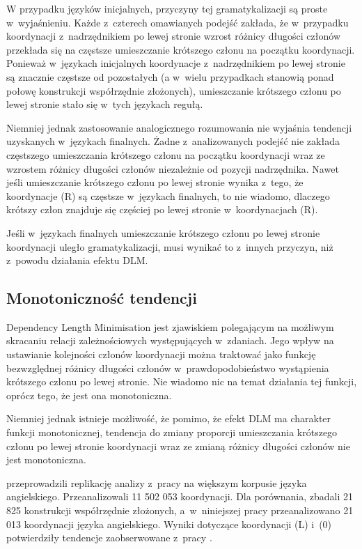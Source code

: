 W przypadku języków inicjalnych, przyczyny tej gramatykalizacji są proste w~wyjaśnieniu. Każde z~czterech omawianych podejść zakłada, że w~przypadku  koordynacji z~nadrzędnikiem po lewej stronie wzrost różnicy długości członów przekłada się na częstsze umieszczanie krótszego członu na początku koordynacji. Ponieważ w~językach inicjalnych koordynacje z~nadrzędnikiem po lewej stronie są znacznie częstsze od pozostałych (a w~wielu przypadkach stanowią ponad połowę konstrukcji współrzędnie złożonych), umieszczanie krótszego członu po lewej stronie stało się w~tych językach regułą. 

Niemniej jednak zastosowanie analogicznego rozumowania nie wyjaśnia tendencji uzyskanych w~językach finalnych. Żadne z~analizowanych podejść nie zakłada częstszego umieszczania krótszego członu na początku koordynacji wraz ze wzrostem różnicy długości członów niezależnie od pozycji nadrzędnika. Nawet jeśli umieszczanie krótszego członu po lewej stronie wynika z~tego, że koordynacje (R) są częstsze w~językach finalnych, to nie wiadomo, dlaczego krótszy człon znajduje się częściej po lewej stronie w~koordynacjach (R).

Jeśli w~językach finalnych umieszczanie krótszego członu po lewej stronie koordynacji uległo gramatykalizacji, musi wynikać to z~innych przyczyn, niż z~powodu działania efektu DLM. 

\subsection{Monotoniczność tendencji}

Dependency Length Minimisation jest zjawiskiem polegającym na możliwym skracaniu relacji zależnościowych występujących w~zdaniach. Jego wpływ na ustawianie kolejności członów koordynacji można traktować jako funkcję bezwzględnej różnicy długości członów w~prawdopodobieństwo wystąpienia krótszego członu po lewej stronie. Nie wiadomo nic na temat działania tej funkcji, oprócz tego, że jest ona monotoniczna.

Niemniej jednak istnieje możliwość, że pomimo, że efekt DLM ma charakter funkcji monotonicznej, tendencja do zmiany proporcji umieszczania krótszego członu po lewej stronie koordynacji wraz ze zmianą różnicy długości członów nie jest monotoniczna. 

\cite{przepiorkowski2024argument} przeprowadzili replikację analizy z~pracy \cite{przepiorkowski2023conjunct} na większym korpusie języka angielskiego. Przeanalizowali 11 502 053 koordynacji. Dla porównania, \cite{przepiorkowski2023conjunct} zbadali 21 825 konstrukcji współrzędnie złożonych, a~w~niniejszej pracy przeanalizowano 21 013 koordynacji języka angielskiego. Wyniki dotyczące koordynacji (L) i~(0) potwierdziły tendencje zaobserwowane z~pracy \cite{przepiorkowski2023conjunct}. 

